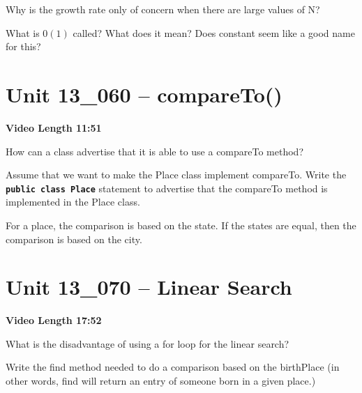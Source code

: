 \documentclass[letterpaper,12pt]{exam}
\newcommand{\unit}{Unit 13}
\begin{document}
\begin{questions}
\begin{samepage}
    \question Why is the growth rate only of concern when there are large values of N?
    \vspace{5mm}
\end{samepage}

\begin{samepage}
    \question What is $0(1)$ called?  What does it mean?  Does constant seem like a good name for this?
    \vspace{15mm}
\end{samepage}



\section*{\unit\_060 -- compareTo()} 
\par{\selectfont\textbf{Video Length 11:51}}

\begin{samepage}
    \question How can a class advertise that it is able to use a compareTo method?
    \vspace{5mm}
\end{samepage}
\begin{samepage}
    \question Assume that we want to make the Place class implement compareTo.  Write the \texttt{\textbf{public class Place}} statement to advertise that the compareTo method is implemented in the Place class.
    \vspace{5mm}
\end{samepage}
\begin{samepage}
    \question For a place, the comparison is based on the state.  If the states are equal, then the comparison is based on the city. 
    \vspace{55mm}
\end{samepage}


\section*{\unit\_070 -- Linear Search } 
\par{\selectfont\textbf{Video Length 17:52}}

\begin{samepage}
    \question What is the disadvantage of using a for loop for the linear search?
    \vspace{5mm}
\end{samepage}
\begin{samepage}
    \question Write the find method needed to do a comparison based on the birthPlace (in other words, find will return an entry of someone born in a given place.)
    \vspace{55mm}
\end{samepage}



\end{questions}
\end{document}
